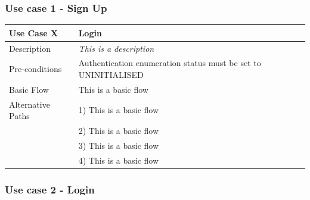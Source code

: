 \documentclass[12pt]{article}
\begin{document}
	\begin{subappendices}
		
	\subsubsection{Use case 1 - Sign Up}
	
	\begin{table}[H]
		\begin{tabular}{ll}
			\hline
			\rowcolor[HTML]{EFEFEF} 
			\textbf{Use Case X}  & \textbf{Login}                                                 \\ \hline
			\rowcolor[HTML]{F5FBFF} 
			Description 		 & \textit{This is a description}                                 \\ \hline
			\rowcolor[HTML]{EFEFEF} 
			Pre-conditions       & Authentication enumeration status must be set to UNINITIALISED \\ \hline
			\rowcolor[HTML]{F5FBFF} 
			Basic Flow           & This is a basic flow                                           \\ \hline
			\rowcolor[HTML]{EFEFEF} 
			Alternative Paths    & 1) This is a basic flow                                        \\
			\rowcolor[HTML]{EFEFEF} 
			& 2) This is a basic flow                                        \\
			\rowcolor[HTML]{EFEFEF} 
			& 3) This is a basic flow                                        \\
			\rowcolor[HTML]{EFEFEF} 
			& 4) This is a basic flow                                       
		\end{tabular}
	\end{table}

	\subsubsection{Use case 2 - Login}
	

\end{subappendices}
\end{document}
